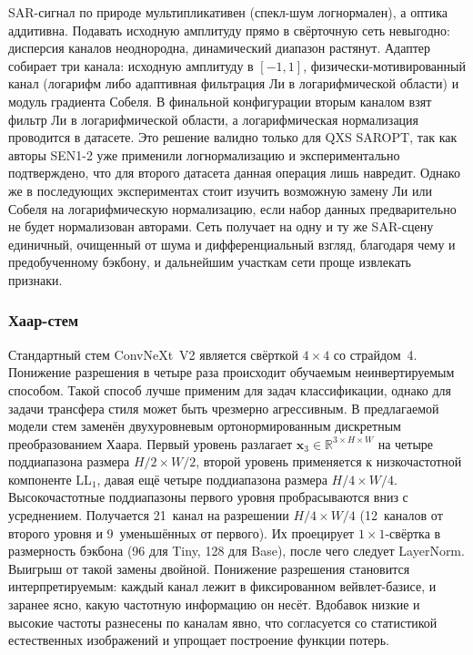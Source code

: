 SAR-сигнал по природе мультипликативен (спекл-шум логнормален), а оптика
аддитивна. Подавать исходную амплитуду прямо в свёрточную сеть невыгодно:
дисперсия каналов неоднородна, динамический диапазон растянут. Адаптер собирает
три канала: исходную амплитуду в $[-1,1]$, физически-мотивированный канал
(логарифм либо адаптивная фильтрация Ли в логарифмической области) и модуль
градиента Собеля. В финальной конфигурации вторым каналом взят фильтр Ли в
логарифмической области, а логарифмическая нормализация проводится в датасете.
Это решение валидно только для QXS SAROPT, так как авторы SEN1-2 уже применили логнормализацию и экспериментально подтверждено,
что для второго датасета данная операция лишь навредит. Однако же в последующих экспериментах стоит изучить возможную замену Ли или Собеля
на логарифмическую нормализацию, если набор данных предварительно не будет нормализован авторами.
Сеть получает на одну и ту же SAR-сцену единичный, очищенный от шума и дифференциальный взгляд, благодаря чему и предобученному бэкбону, и дальнейшим участкам сети проще извлекать признаки.

\subsubsection{Хаар-стем}

Стандартный стем ConvNeXt~V2 является свёрткой $4{\times}4$ со страйдом~4.
Понижение разрешения в четыре раза происходит обучаемым неинвертируемым способом.
Такой способ лучше применим для задач классификации, однако для задачи трансфера стиля может быть чрезмерно агрессивным.
В предлагаемой модели стем заменён двухуровневым ортонормированным дискретным преобразованием Хаара.
Первый уровень разлагает $\mathbf{x}_{3}\in\mathbb{R}^{3\times H\times W}$ на
четыре поддиапазона размера $H/2\times W/2$, второй уровень применяется к
низкочастотной компоненте LL$_{1}$, давая ещё четыре поддиапазона размера
$H/4\times W/4$. Высокочастотные поддиапазоны первого уровня пробрасываются вниз
с усреднением. Получается 21~канал на разрешении $H/4\times W/4$
(12~каналов от второго уровня и 9~уменьшённых от первого). Их проецирует
$1{\times}1$-свёртка в размерность бэкбона (96 для Tiny, 128 для Base), после чего
следует LayerNorm. Выигрыш от такой замены двойной. Понижение разрешения
становится интерпретируемым: каждый канал лежит в фиксированном
вейвлет-базисе, и заранее ясно, какую частотную информацию он несёт. Вдобавок
низкие и высокие частоты разнесены по каналам явно, что согласуется со
статистикой естественных изображений и упрощает построение функции потерь.

